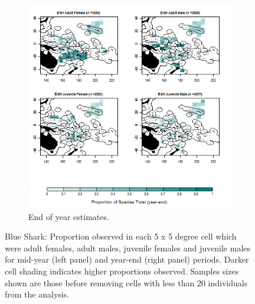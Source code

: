 \documentclass[12pt]{SCreport}
\begin{document}
\begin{landscape}
\begin{figure}
\begin{subfigure}[b]{0.6\textwidth}
       \includegraphics[width=\textwidth]{../GRAPHICS/Defined/BI_19_Map_maturity_sex_BSH}
       \caption{End of year estimates.}
       \label{fig:BI_19}
   \end{subfigure}
\caption{Blue Shark:  Proportion observed in each 5 x 5 degree cell which were adult females, adult males, juvenile females and juvenile males for mid-year (left panel) and year-end (right panel) periods. Darker cell shading indicates higher proportions observed. Samples sizes shown are those before removing cells with less than 20 individuals from the analysis. }
\label{BI_M01} 
\end{figure}
\end{landscape}
\end{document}
